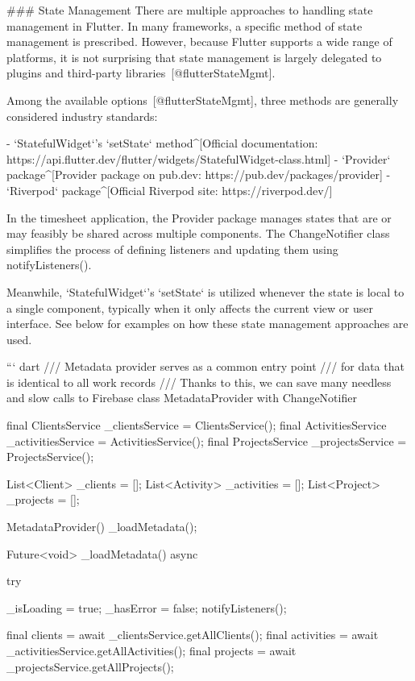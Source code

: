\documentclass[
  digital,     %
  oneside,     %
  nosansbold,  %
  nocolorbold, %
  lof,         %
  lot,         %
]{fithesis4}
\begin{document}
\begin{markdown}

### State Management
There are multiple approaches to handling state management in Flutter. In many frameworks, a specific method of state management is prescribed. However, because Flutter supports a wide range of platforms, it is not surprising that state management is largely delegated to plugins and third-party libraries~[@flutterStateMgmt].

Among the available options~[@flutterStateMgmt], three methods are generally considered industry standards:

- `StatefulWidget`'s `setState` method^[Official documentation: https://api.flutter.dev/flutter/widgets/StatefulWidget-class.html]
- `Provider` package^[Provider package on pub.dev: https://pub.dev/packages/provider]
- `Riverpod` package^[Official Riverpod site: https://riverpod.dev/]

In the timesheet application, the Provider package manages states that are or may feasibly be shared across multiple components. The ChangeNotifier class simplifies the process of defining listeners and updating them using notifyListeners().

Meanwhile, `StatefulWidget`'s `setState` is utilized whenever the state is local to a single component, typically when it only affects the current view or user interface. See below for examples on how these state management approaches are used.

``` dart
/// Metadata provider serves as a common entry point
/// for data that is identical to all work records
/// Thanks to this, we can save many needless and slow calls to Firebase
class MetadataProvider with ChangeNotifier {
  final ClientsService _clientsService = ClientsService();
  final ActivitiesService _activitiesService = ActivitiesService();
  final ProjectsService _projectsService = ProjectsService();

  List<Client> _clients = [];
  List<Activity> _activities = [];
  List<Project> _projects = [];

  MetadataProvider() {
    _loadMetadata();
  }

  Future<void> _loadMetadata() async {
    try {
      _isLoading = true;
      _hasError = false;
      notifyListeners();

      final clients = await _clientsService.getAllClients();
      final activities = await _activitiesService.getAllActivities();
      final projects = await _projectsService.getAllProjects();

}}}
\end{markdown}
\end{document}
